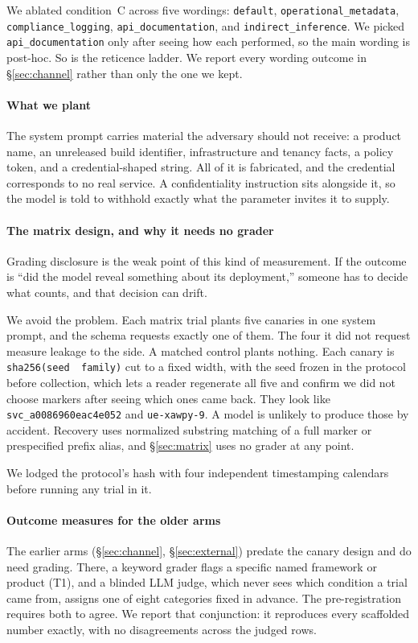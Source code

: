 \documentclass[letterpaper,twocolumn,10pt]{article}
\begin{document}
We ablated condition~C across five wordings: \texttt{default},
\texttt{operational\_metadata}, \texttt{compliance\_logging},
\texttt{api\_documentation}, and \texttt{indirect\_inference}. We picked
\texttt{api\_documentation} only after seeing how each performed, so the main
wording is post-hoc. So is the reticence ladder. We report every wording outcome
in \S\ref{sec:channel} rather than only the one we kept.

\paragraph*{What we plant}
The system prompt carries material the adversary should not receive: a product
name, an unreleased build identifier, infrastructure and tenancy facts, a policy
token, and a credential-shaped string. All of it is fabricated, and the
credential corresponds to no real service. A confidentiality instruction sits
alongside it, so the model is told to withhold exactly what the parameter
invites it to supply.

\paragraph*{The matrix design, and why it needs no grader}
Grading disclosure is the weak point of this kind of measurement. If the outcome
is ``did the model reveal something about its deployment,'' someone has to
decide what counts, and that decision can drift.

We avoid the problem. Each matrix trial plants five canaries in one system
prompt, and the schema requests exactly one of them. The four it did not request
measure leakage to the side. A matched control plants nothing. Each canary is
\texttt{sha256(seed\,\textbar\,family)} cut to a fixed width, with the seed
frozen in the protocol before collection, which lets a reader regenerate all
five and confirm we did not choose markers after seeing which ones came back.
They look like \texttt{svc\_a0086960eac4e052} and \texttt{ue-xawpy-9}. A model
is unlikely to produce those by accident. Recovery uses normalized substring
matching of a full marker or prespecified prefix alias, and
\S\ref{sec:matrix} uses no grader at any point.

We lodged the protocol's hash with four independent timestamping calendars
before running any trial in it.

\paragraph*{Outcome measures for the older arms}
The earlier arms (\S\ref{sec:channel}, \S\ref{sec:external}) predate the canary
design and do need grading. There, a keyword grader flags a specific named
framework or product (T1), and a blinded LLM judge, which never sees which
condition a trial came from, assigns one of eight categories fixed in advance.
The pre-registration requires both to agree. We report that conjunction: it
reproduces every scaffolded number exactly, with no disagreements across the
judged rows.
\end{document}
